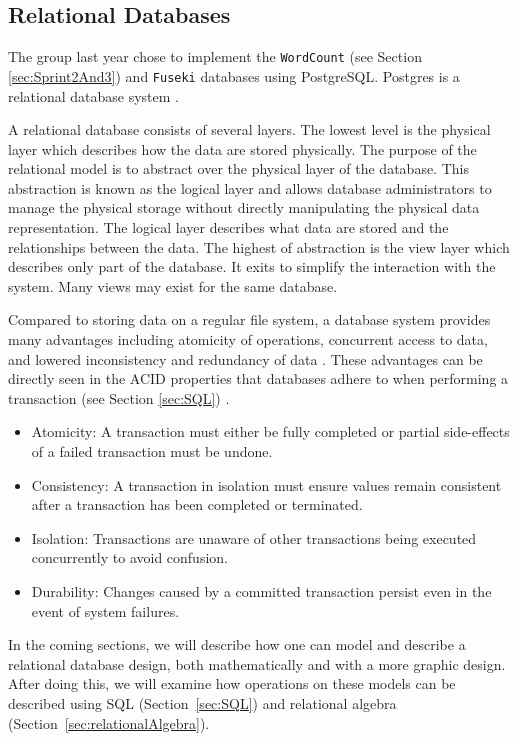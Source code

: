 \subsection{Relational Databases}
The group last year chose to implement the \texttt{WordCount} (see Section \ref{sec:Sprint2And3}) and \texttt{Fuseki} databases using PostgreSQL.
Postgres is a relational database system \cite{knox2020}.


A relational database consists of several layers.
The lowest level is the physical layer which describes how the data are stored physically.
The purpose of the relational model is to abstract over the physical layer of the database.
This abstraction is known as the logical layer and allows database administrators to manage the physical storage without directly manipulating the physical data representation.
The logical layer describes what data are stored and the relationships between the data.
The highest of abstraction is the view layer which describes only part of the database. It exits to simplify the interaction with the system. Many views may exist for the same database.
\cite[Chapter 1.3]{DBSBook}

Compared to storing data on a regular file system, a database system provides many advantages including atomicity of operations, concurrent access to data, and lowered inconsistency and redundancy of data \cite[Chapter 1.2]{DBSBook}.
These advantages can be directly seen in the ACID properties that databases adhere to when performing a transaction (see Section \ref{sec:SQL}) \cite[Chapter~17]{DBSBook}.
\begin{itemize} \label{ACID}
    \item Atomicity: A transaction must either be fully completed or partial side-effects of a failed transaction must be undone.
    \item Consistency: A transaction in isolation must ensure values remain consistent after a transaction has been completed or terminated.
    \item Isolation: Transactions are unaware of other transactions being executed concurrently to avoid confusion.
    \item Durability: Changes caused by a committed transaction persist even in the event of system failures.
\end{itemize}

In the coming sections, we will describe how one can model and describe a relational database design, both mathematically and with a more graphic design.
After doing this, we will examine how operations on these models can be described using SQL (Section~\ref{sec:SQL}) and relational algebra (Section~\ref{sec:relationalAlgebra}).

